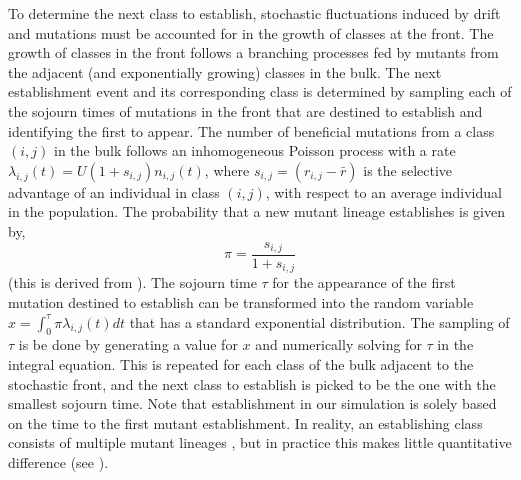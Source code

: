 \documentclass[9pt,twocolumn,twoside]{gsajnl}
\begin{document}
To determine the next class to establish, stochastic fluctuations induced by drift and mutations must be accounted for in the growth of classes at the front. The growth of classes in the front follows a branching processes fed by mutants from the adjacent (and exponentially growing) classes in the bulk.  The next establishment event and its corresponding class  is determined by sampling each of the sojourn times of mutations in the front that are destined to establish and identifying the first to appear.   The number of beneficial mutations from a class $(i,j)$ in the bulk follows an inhomogeneous Poisson  process with a rate $\lambda_{i,j}(t)=U (1+s_{i,j}) n_{i,j}(t)$, where $s_{i,j}=(r_{i,j}-\bar{r})$ is the selective advantage of an individual in class $(i,j)$, with respect to an average individual in the population. The probability that a new mutant lineage establishes is given by, 
\begin{equation} \label{eq:2}
\pi = \frac{s_{i,j}}{ 1+s_{i,j}}
\end{equation} 
(this is derived from \cite[Equation 16]{desai2007beneficial}). The sojourn time $\tau$ for the appearance of the first mutation destined to establish can be transformed into the random variable $x=\int_0^\tau \pi \lambda_{i,j}(t) dt$ that has a standard exponential distribution. The sampling of $\tau$ is be done by generating a value for  $x$ and numerically solving for $\tau$ in the integral equation. This is repeated for each class of the bulk adjacent to the stochastic front, and the next class to establish is picked to be the one with the smallest sojourn time. Note that establishment in our simulation is solely based on the time to the first mutant establishment. In reality, an establishing class consists of multiple mutant lineages \cite{Desai2013}, but in practice this makes little quantitative difference (see \cite[p.1773]{desai2007beneficial}). 
\end{document}

